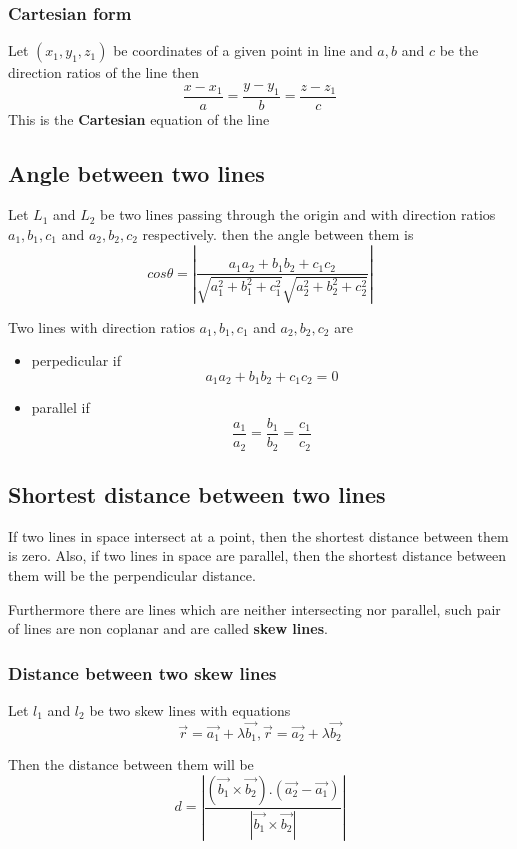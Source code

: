 \documentclass[12pt]{article}
\begin{document}
\subsubsection*{Cartesian form}
Let $(x_1,y_1,z_1)$ be coordinates of a given point in line and $a,b$ and $c$ be the direction ratios of the line then $$\frac{x-x_1}{a}=\frac{y-y_1}{b}=\frac{z-z_1}{c}$$ This is the \textbf{Cartesian} equation of the line

\subsection*{Angle between two lines}
Let $L_1$ and $L_2$ be two lines passing through the origin and with direction ratios $a_1,b_1,c_1$ and $a_2,b_2,c_2$ respectively. then the angle between them is $$cos \theta =\left|\frac{a_1a_2+b_1b_2+c_1c_2}{\sqrt{a_1^2+b_1^2+c_1^2}\sqrt{a_2^2+b_2^2+c_2^2}}\right|$$

Two lines with direction ratios $a_1,b_1,c_1$ and $a_2,b_2,c_2$ are 
\begin{itemize}
    \item perpedicular if $$a_1a_2+b_1b_2+c_1c_2=0$$
    \item parallel if $$\frac{a_1}{a_2}=\frac{b_1}{b_2}=\frac{c_1}{c_2}$$
\end{itemize}
\subsection*{Shortest distance between two lines}
If two lines in space intersect at a point,
then the shortest distance between them is
zero. Also, if two lines in space are parallel,
then the shortest distance between them
will be the perpendicular distance.

Furthermore there are lines which are neither intersecting nor parallel, such pair of lines are non coplanar and
are called \textbf{skew lines}.
\subsubsection*{Distance between two skew lines }

Let $l_1$ and $l_2$ be two skew lines with equations 
$$\vec{r}=\vec{a_1}+\lambda \vec{b_1},\vec{r}=\vec{a_2}+\lambda \vec{b_2}$$

Then the distance between them will be $$d=\left|\frac{(\vec{b_1}\times \vec{b_2}). (\vec{a_2} -\vec{a_1})}{|\vec{b_1} \times \vec{b_2}|}\right|$$
\end{document}
